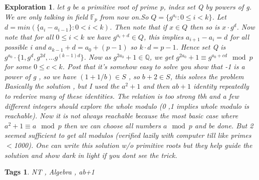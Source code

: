 \documentclass{article}
\newtheorem*{exploration}{Exploration}
\newtheorem*{tags}{Tags}
\begin{document}
	\begin{exploration}
		 let g be a primitive root of prime p, index set Q by powers of g. We are only talking in field $\mathbb{F}_p$ from now on.So
		$Q= \{g^{a_i}: 0 \leq i < k \}$. Let $d= min(\{a_{i}-a_{i-1}\} : 0<i<k)$. Then note that if $x \in Q$ then so is $x \cdot g^d$. Now note that for all $0 \leq i < k $ we have $g^{a_i+d} \in Q$, this implies $a_{i+1}-a_{i}=d$ for all possible i and $a_{k-1}+d=a_0+(p-1)$ so $k \cdot d = p-1$. Hence set Q is $g^{a_0} \cdot \{1,g^d,g^{2d}, \dots g^{(k-1)d}\}$. Now as $g^{2a_0}+1 \in \mathbb{Q}$, we get $g^{2a_0}+1 \equiv g^{a_0 + cd} \mod p$ for some $0 \leq c< k$. Post that it's somehow easy to solve you show that -1 is a power of g , so we have $(1+1/b) \in S$ , so $b+2 \in S$, this solves the problem
		Basically the solution , but I used the $a^2+1$ and then $ab+1$ identity repeatedly to rederive many of these identities. The relation is too strong tbh and a few different integers should explore the whole modulo (0 ,1 implies whole modulo is reachable). Now it is not always reachable because the most basic case where $a^2 +1 \equiv a \mod p$ then we can choose all numbers $a \mod p$ and be done. But 2 seemed sufficient to get all modulos (verified lazily with computer till like primes$<$1000). One can write this solution w/o primitive roots but they help guide the solution and show dark in light if you dont see the trick.
	\end{exploration}
	
	\begin{tags}
		NT ,  Algebra , ab+1
	\end{tags}
	
\end{document}
